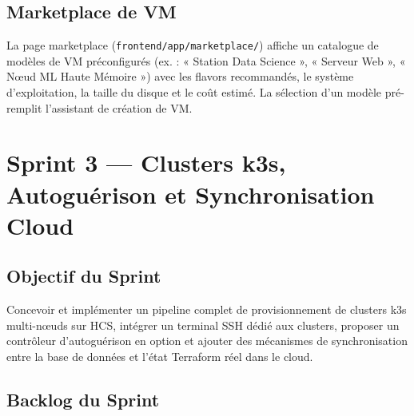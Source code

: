 
\subsection{Marketplace de VM}

La page marketplace (\texttt{frontend/app/marketplace/}) affiche un catalogue de
modèles de VM préconfigurés (ex. : « Station Data Science », « Serveur Web »,
« Nœud ML Haute Mémoire ») avec les flavors recommandés, le système d'exploitation,
la taille du disque et le coût estimé. La sélection d'un modèle pré-remplit l'assistant
de création de VM.

\section{Sprint 3 --- Clusters k3s, Autoguérison et Synchronisation Cloud}

\subsection{Objectif du Sprint}

Concevoir et implémenter un pipeline complet de provisionnement de clusters k3s
multi-nœuds sur HCS, intégrer un terminal SSH dédié aux clusters, proposer un
contrôleur d'autoguérison en option et ajouter des mécanismes de synchronisation
entre la base de données et l'état Terraform réel dans le cloud.

\subsection{Backlog du Sprint}

